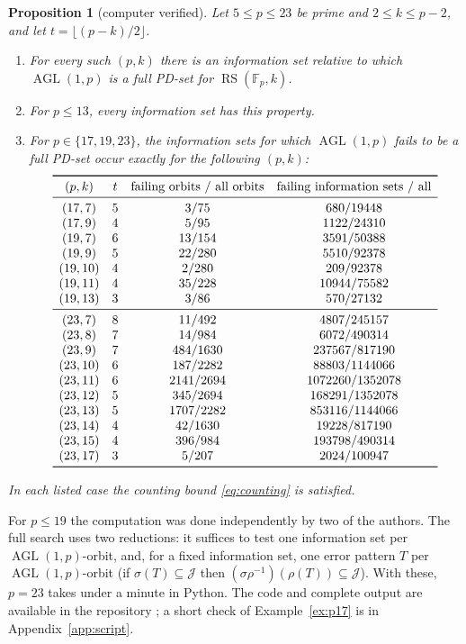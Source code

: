 \documentclass[12pt,letterpaper]{article}
\newtheorem{proposition}[theorem]{Proposition}
\theoremstyle{definition}
\theoremstyle{remark}
\numberwithin{equation}{section}
\newcommand{\F}{\mathbb{F}}
\newcommand{\RS}{\operatorname{RS}}
\newcommand{\AGL}{\operatorname{AGL}}
\newcommand{\cJ}{\mathcal{J}}
\begin{document}
\begin{proposition}[computer verified]\label{prop:small-p}
Let $5\le p\le23$ be prime and $2\le k\le p-2$, and let
$t=\lfloor(p-k)/2\rfloor$.
\begin{enumerate}
\item For every such $(p,k)$ there is an information set relative to
which $\AGL(1,p)$ is a full PD-set for $\RS(\F_p,k)$.
\item For $p\le13$, every information set has this property.
\item For $p\in\{17,19,23\}$, the information sets for which $\AGL(1,p)$
fails to be a full PD-set occur exactly for the following
$(p,k)$:
\[
\begin{array}{cccc}
\toprule
(p,k) & t & \text{failing orbits / all orbits} &
\text{failing information sets / all}\\
\midrule
(17,7) & 5 & 3/75 & 680/19448\\
(17,9) & 4 & 5/95 & 1122/24310\\
(19,7) & 6 & 13/154 & 3591/50388\\
(19,9) & 5 & 22/280 & 5510/92378\\
(19,10) & 4 & 2/280 & 209/92378\\
(19,11) & 4 & 35/228 & 10944/75582\\
(19,13) & 3 & 3/86 & 570/27132\\
\midrule
(23,7) & 8 & 11/492 & 4807/245157\\
(23,8) & 7 & 14/984 & 6072/490314\\
(23,9) & 7 & 484/1630 & 237567/817190\\
(23,10) & 6 & 187/2282 & 88803/1144066\\
(23,11) & 6 & 2141/2694 & 1072260/1352078\\
(23,12) & 5 & 345/2694 & 168291/1352078\\
(23,13) & 5 & 1707/2282 & 853116/1144066\\
(23,14) & 4 & 42/1630 & 19228/817190\\
(23,15) & 4 & 396/984 & 193798/490314\\
(23,17) & 3 & 5/207 & 2024/100947\\
\bottomrule
\end{array}
\]
\end{enumerate}
In each listed case the counting bound \eqref{eq:counting} is satisfied.
\end{proposition}

For $p\le19$ the computation was done independently by two of the
authors.  The full search uses two reductions: it suffices to test one
information set per $\AGL(1,p)$-orbit, and, for a fixed information set,
one error pattern $T$ per $\AGL(1,p)$-orbit (if $\sigma(T)\subseteq\cJ$
then $(\sigma\rho^{-1})(\rho(T))\subseteq\cJ$).  With these, $p=23$
takes under a minute in Python.  The code and complete output are
available in the repository \cite{Jo26}; a short check of
Example~\ref{ex:p17} is in Appendix~\ref{app:script}.
\end{document}

